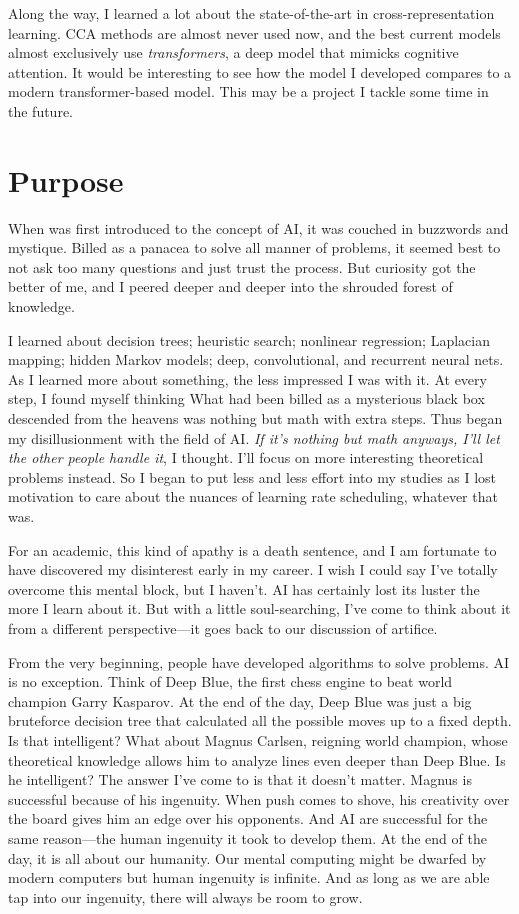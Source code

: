 \documentclass[12pt, titlepage]{article}
\begin{document}
Along the way, I learned a lot about the state-of-the-art in cross-representation learning. CCA methods are almost never used now, and the best current models almost exclusively use \textit{transformers}, a deep model that mimicks cognitive attention. It would be interesting to see how the model I developed compares to a modern transformer-based model. This may be a project I tackle some time in the future.

\section{Purpose}
When was first introduced to the concept of AI, it was couched in buzzwords and mystique. Billed as a panacea to solve all manner of problems, it seemed best to not ask too many questions and just trust the process. But curiosity got the better of me, and I peered deeper and deeper into the shrouded forest of knowledge.

I learned about decision trees; heuristic search; nonlinear regression; Laplacian mapping; hidden Markov models; deep, convolutional, and recurrent neural nets. As I learned more about something, the less impressed I was with it. At every step, I found myself thinking  What had been billed as a mysterious black box descended from the heavens was nothing but math with extra steps. Thus began my disillusionment with the field of AI. \textit{If it's nothing but math anyways, I'll let the other people handle it}, I thought. I'll focus on more interesting theoretical problems instead. So I began to put less and less effort into my studies as I lost motivation to care about the nuances of learning rate scheduling, whatever that was.

For an academic, this kind of apathy is a death sentence, and I am fortunate to have discovered my disinterest early in my career. I wish I could say I've totally overcome this mental block, but I haven't. AI has certainly lost its luster the more I learn about it. But with a little soul-searching, I've come to think about it from a different perspective---it goes back to our discussion of artifice.

From the very beginning, people have developed algorithms to solve problems. AI is no exception. Think of Deep Blue, the first chess engine to beat world champion Garry Kasparov. At the end of the day, Deep Blue was just a big bruteforce decision tree that calculated all the possible moves up to a fixed depth. Is that intelligent? What about Magnus Carlsen, reigning world champion, whose theoretical knowledge allows him to analyze lines even deeper than Deep Blue. Is he intelligent? The answer I've come to is that it doesn't matter. Magnus is successful because of his ingenuity. When push comes to shove, his creativity over the board gives him an edge over his opponents. And AI are successful for the same reason---the human ingenuity it took to develop them. At the end of the day, it is all about our humanity. Our mental computing might be dwarfed by modern computers but human ingenuity is infinite. And as long as we are able tap into our ingenuity, there will always be room to grow.
\end{document}
